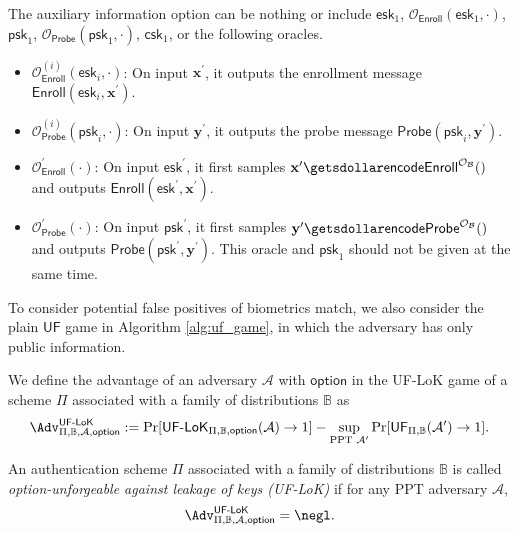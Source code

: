 The auxiliary information \textsf{option} can be nothing or include $\textsf{esk}_1$, $\mathcal{O}_\textsf{Enroll}(\textsf{esk}_1, \cdot)$, $\textsf{psk}_1$, $\mathcal{O}_\textsf{Probe}(\textsf{psk}_1, \cdot)$, $\textsf{csk}_1$, or the following oracles.

\begin{itemize}
	
	\item $\mathcal{O}_\textsf{Enroll}^{(i)}(\textsf{esk}_i, \cdot)$: On input $\mathbf{x}^\prime$, it outputs the enrollment message $\textsf{Enroll}(\textsf{esk}_i, \mathbf{x}^\prime)$.

	\item $\mathcal{O}_\textsf{Probe}^{(i)}(\textsf{psk}_i, \cdot)$: On input $\mathbf{y}^\prime$, it outputs the probe message $\textsf{Probe}(\textsf{psk}_i, \mathbf{y}^\prime)$. 
	
	\item $\mathcal{O}_\textsf{Enroll}^\prime (\cdot)$: On input $\textsf{esk}^\prime$, it first samples $\mathbf{x}^\prime \getsdollar \textsf{encodeEnroll}^{\mathcal{O}_{\mathcal{B}}}()$ and outputs $\textsf{Enroll}(\textsf{esk}^\prime, \mathbf{x}^\prime)$.

	\item $\mathcal{O}_\textsf{Probe}^\prime (\cdot)$: On input $\textsf{psk}^\prime$, it first samples $\mathbf{y}^\prime \getsdollar \textsf{encodeProbe}^{\mathcal{O}_{\mathcal{B}}}()$ and outputs $\textsf{Probe}(\textsf{psk}^\prime, \mathbf{y}^\prime)$. This oracle and $\textsf{psk}_1$ should not be given at the same time. 

\end{itemize}

To consider potential false positives of biometrics match, we also consider the plain $\textsf{UF}$ game in Algorithm \ref{alg:uf_game}, in which the adversary has only public information.

We define the advantage of an adversary $\mathcal{A}$ with $\textsf{option}$ in the \textsf{UF-LoK} game of a scheme $\Pi$ associated with a family of distributions $\mathbb{B}$ as
\[
	\Adv^{\textsf{UF-LoK}}_{\Pi, \mathbb{B}, \mathcal{A}, \textsf{option}} := \Pr[{\textsf{UF-LoK}}_{\Pi, \mathbb{B}, \textsf{option}}(\mathcal{A}) \to 1] -
	\sup_{\text{PPT } \mathcal{A}^\prime} \Pr[\textsf{UF}_{\Pi, \mathbb{B}}(\mathcal{A}^\prime) \to 1].
\]

An authentication scheme $\Pi$ associated with a family of distributions $\mathbb{B}$ is called \emph{\textsf{option}-unforgeable against leakage of keys (UF-LoK)} if for any PPT adversary $\mathcal{A}$,
\[
	\Adv^{\textsf{UF-LoK}}_{\Pi, \mathbb{B}, \mathcal{A}, \textsf{option}} = \negl.
\]


